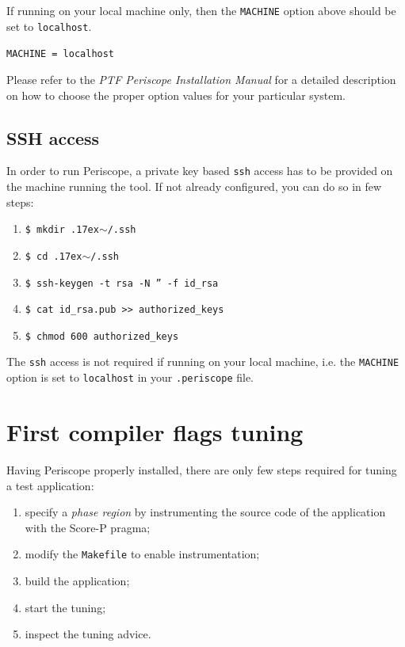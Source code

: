 \documentclass[11pt,oneside,a4paper]{book}
\newcommand{\mytilde}{\raise.17ex\hbox{$\scriptstyle\sim$}}
\newenvironment{code}%
{
\addtolength{\leftskip}{0.5cm}}%
{

}
\begin{document}
If running on your local machine only, then the \texttt{MACHINE} option above should be set to \texttt{localhost}.

\begin{code}
\texttt{MACHINE = localhost}
\end{code}

Please refer to the \textit{PTF Periscope Installation Manual} for a detailed description on how to choose the proper option values for your particular system.

\subsection{SSH access}

In order to run Periscope, a private key based \texttt{ssh} access has to be provided on the machine running the tool. If not already configured, you can do so in few steps:

\begin{enumerate}
\item \texttt{\$ mkdir \mytilde/.ssh}
\item \texttt{\$ cd \mytilde/.ssh}
\item \texttt{\$ ssh-keygen -t rsa -N '' -f id\_rsa}
\item \texttt{\$ cat id\_rsa.pub \textgreater\textgreater\ authorized\_keys}
\item \texttt{\$ chmod 600 authorized\_keys}
\end{enumerate}

The \texttt{ssh} access is not required if running on your local machine, i.e. the \texttt{MACHINE} option is set to \texttt{localhost} in your \texttt{.periscope} file.


\section{First compiler flags tuning}

Having Periscope properly installed, there are only few steps required for tuning a test application:

\begin{enumerate}
	\item specify a \textit{phase region} by instrumenting the source code of the application with the Score-P pragma;
	\item modify the \texttt{Makefile} to enable instrumentation;
	\item build the application;
	\item start the tuning;
	\item inspect the tuning advice.
\end{enumerate}
\end{document}
